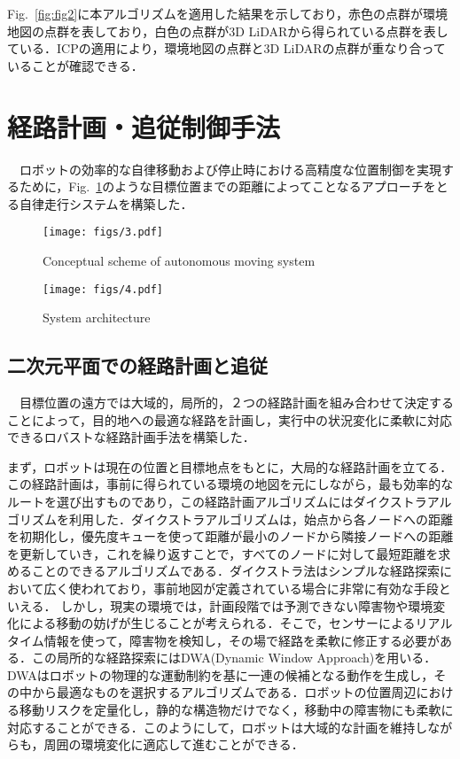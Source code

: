 Fig.~\ref{fig:fig2}に本アルゴリズムを適用した結果を示しており，赤色の点群が環境地図の点群を表しており，白色の点群が3D LiDARから得られている点群を表している．ICPの適用により，環境地図の点群と3D LiDARの点群が重なり合っていることが確認できる．

\section{経路計画・追従制御手法}
\label{sec:control}
　ロボットの効率的な自律移動および停止時における高精度な位置制御を実現するために，Fig.~\ref{fig:fig3}のような目標位置までの距離によってことなるアプローチをとる自律走行システムを構築した．

\begin{figure}[!t]
\texttt{[image: figs/3.pdf]}
\caption{Conceptual scheme of autonomous moving system}
\label{fig:fig3}
\end{figure}

\begin{figure}[!t]
\texttt{[image: figs/4.pdf]}
\caption{System architecture}
\label{fig:fig4}
\end{figure}

\subsection{二次元平面での経路計画と追従}
　目標位置の遠方では大域的，局所的，２つの経路計画を組み合わせて決定することによって，目的地への最適な経路を計画し，実行中の状況変化に柔軟に対応できるロバストな経路計画手法を構築した．

まず，ロボットは現在の位置と目標地点をもとに，大局的な経路計画を立てる．この経路計画は，事前に得られている環境の地図を元にしながら，最も効率的なルートを選び出すものであり，この経路計画アルゴリズムにはダイクストラアルゴリズム\cite{dijkstra}を利用した．ダイクストラアルゴリズムは，始点から各ノードへの距離を初期化し，優先度キューを使って距離が最小のノードから隣接ノードへの距離を更新していき，これを繰り返すことで，すべてのノードに対して最短距離を求めることのできるアルゴリズムである．ダイクストラ法はシンプルな経路探索において広く使われており，事前地図が定義されている場合に非常に有効な手段といえる．
しかし，現実の環境では，計画段階では予測できない障害物や環境変化による移動の妨げが生じることが考えられる．そこで，センサーによるリアルタイム情報を使って，障害物を検知し，その場で経路を柔軟に修正する必要がある．この局所的な経路探索にはDWA(Dynamic Window Approach)\cite{DWA}を用いる．DWAはロボットの物理的な運動制約を基に一連の候補となる動作を生成し，その中から最適なものを選択するアルゴリズムである．ロボットの位置周辺における移動リスクを定量化し，静的な構造物だけでなく，移動中の障害物にも柔軟に対応することができる．このようにして，ロボットは大域的な計画を維持しながらも，周囲の環境変化に適応して進むことができる．


